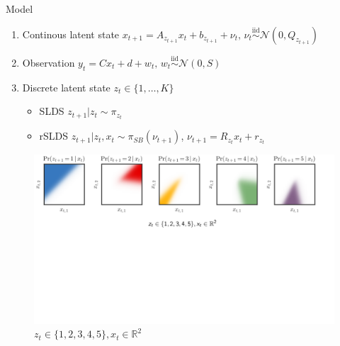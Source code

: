 \documentclass{beamer}
\begin{document}
\begin{frame}{Model}%

\begin{tcolorbox}[colback=blue!10!white,colframe=blue!50!black,title=SLDS and rSLDS,boxrule=2pt, boxsep=0.1em, left=0.1em, right=0.1em,
fontupper=\fontsize{8}{10}\selectfont] %
\begin{enumerate}[\textbullet]
\item Continous latent state $x_{t+1}=A_{z_{t+1}}x_t+b_{z_{t+1}}+\nu_t \text{, } \nu_t \overset{\mathrm{iid}}{\sim} \mathcal{N}(0,Q_{z_{t+1}})$
\item Observation $y_t=C x_t+d+w_t\text{, }w_t \overset{\mathrm{iid}}{\sim} \mathcal{N}(0,S)$
    \item Discrete latent state $z_t \in \{1,\dots,K\}$
        \begin{itemize}
            \item SLDS {\cite{Ackerson&Fu}}
$z_{t+1} | z_t \sim \pi_{z_t}$
            \item rSLDS {\cite{Barber}}
 $z_{t+1} | z_t, x_t \sim \pi_{SB}(\nu_{t+1})$, $\nu_{t+1}=R_{z_t}x_t+r_{z_t}$
        \end{itemize}
\end{enumerate}
\end{tcolorbox}
       

   

\begin{figure}
	\centering
    \includegraphics[width=1.0\linewidth]{gallery/z_on_x.png}
	\caption{$z_t \in \{1,2,3,4,5\}, x_t \in \mathbb{R}^2$}
\end{figure}



    \end{frame}
\end{document}
